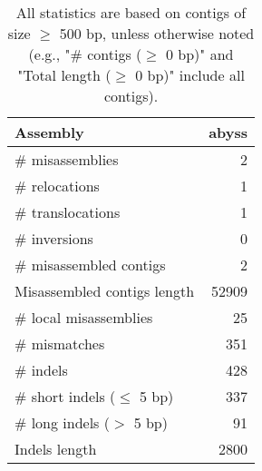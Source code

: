 \documentclass[12pt,a4paper]{article}
\begin{document}
\begin{table}[ht]
\begin{center}
\caption{All statistics are based on contigs of size $\geq$ 500 bp, unless otherwise noted (e.g., "\# contigs ($\geq$ 0 bp)" and "Total length ($\geq$ 0 bp)" include all contigs).}
\begin{tabular}{|l*{1}{|r}|}
\hline
Assembly & abyss \\ \hline
\# misassemblies & 2 \\ \hline
\hspace{5mm}\# relocations & 1 \\ \hline
\hspace{5mm}\# translocations & 1 \\ \hline
\hspace{5mm}\# inversions & 0 \\ \hline
\# misassembled contigs & 2 \\ \hline
Misassembled contigs length & 52909 \\ \hline
\# local misassemblies & 25 \\ \hline
\# mismatches & 351 \\ \hline
\# indels & 428 \\ \hline
\hspace{5mm}\# short indels ($\leq$ 5 bp) & 337 \\ \hline
\hspace{5mm}\# long indels ($>$ 5 bp) & 91 \\ \hline
Indels length & 2800 \\ \hline
\end{tabular}
\end{center}
\end{table}
\end{document}
